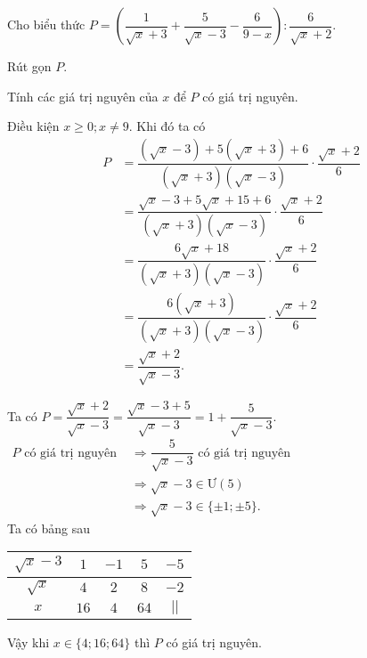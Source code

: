 \begin{bt}%
	Cho biểu thức $P=\left(\dfrac{1}{\sqrt{x} + 3} + \dfrac{5}{\sqrt{x} - 3} - \dfrac{6}{9 - x}\right) :\dfrac{6}{\sqrt{x} + 2}$.
	\begin{listEX}
	\item Rút gọn $P$.
	\item Tính các giá trị nguyên của $x$ để $P$ có giá trị nguyên.
	\end{listEX}
	\loigiai
	{
	\begin{listEX}
	\item Điều kiện $x\geq 0 ; x\neq 9$. Khi đó ta có 
	\allowdisplaybreaks 
	\begin{align*}
	P&=\dfrac{(\sqrt{x} - 3) + 5(\sqrt{x} + 3) + 6}{(\sqrt{x} + 3)(\sqrt{x} - 3)}\cdot\dfrac{\sqrt{x} + 2}{6}\\
	&=\dfrac{\sqrt{x} - 3 + 5\sqrt{x} + 15 + 6}{(\sqrt{x} + 3)(\sqrt{x} - 3)}\cdot\dfrac{\sqrt{x} + 2}{6}\\
	&=\dfrac{6\sqrt{x} + 18}{(\sqrt{x} + 3)(\sqrt{x} - 3)}\cdot\dfrac{\sqrt{x} + 2}{6}\\
	&=\dfrac{6(\sqrt{x} + 3)}{(\sqrt{x} + 3)(\sqrt{x} - 3)}\cdot\dfrac{\sqrt{x} + 2}{6}\\
	&=\dfrac{\sqrt{x} + 2}{\sqrt{x} - 3}.
	\end{align*}
	\item Ta có $P=\dfrac{\sqrt{x} + 2}{\sqrt{x} - 3}=\dfrac{\sqrt{x} - 3 + 5}{\sqrt{x} - 3}=1 + \dfrac{5}{\sqrt{x} - 3}$. \\ 
$\begin{aligned}
P \text{ có giá trị nguyên }	&{\Rightarrow \dfrac{5}{\sqrt{x} - 3}\text{ có giá trị nguyên}}\\
&{\Rightarrow \sqrt{x} - 3\in \text{Ư}(5)}\\
&{\Rightarrow \sqrt{x} - 3\in\{\pm 1 ;\pm 5\}}.
\end{aligned}$\\
Ta có bảng sau
\begin{center}
\begin{tabular}{|c|c|c|c|c|}
	\hline 
	$\sqrt{x}-3$& $1$ & $-1$ &$5$& $-5$ \\ 
	\hline 
$\sqrt{x}$	& $4$ & $2$ & $8$ & $-2$ \\ 
	\hline 
$x$	& $16$ & $4$ & $64$ & $||$ \\ 
	\hline 
\end{tabular} 
\end{center}
Vậy khi $x\in\{4;16;64\}$ thì $P$ có giá trị nguyên.
\end{listEX}
	}
\end{bt}

